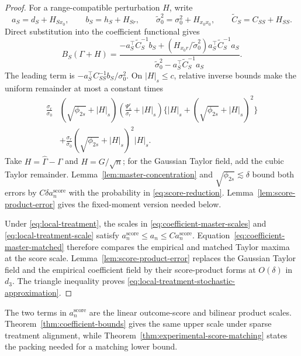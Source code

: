\documentclass[a4paper,11pt,english]{article}
\begin{document}
\begin{proof}
For a range-compatible perturbation $H$, write
\[
        a_S=d_S+H_{Sx_0},\qquad b_S=h_S+H_{Sr},\qquad
        \widetilde\sigma_0^2=\sigma_0^2+H_{x_0x_0},\qquad
        \widetilde C_S=C_{SS}+H_{SS}.
\]
Direct substitution into the coefficient functional gives
\begin{equation}\label{eq:exact-local-treatment-perturbation}
        B_S(\Gamma+H)
        =\frac{
        -a_S^\top\widetilde C_S^{-1}b_S
        +(H_{x_0r}/\widetilde\sigma_0^2)
        a_S^\top\widetilde C_S^{-1}a_S}
        {\widetilde\sigma_0^2
        -a_S^\top\widetilde C_S^{-1}a_S}.
\end{equation}
The leading term is
$-a_S^\top C_{SS}^{-1}b_S/\sigma_0^2$.
On $|H|_s\le c$, relative inverse bounds make the uniform remainder at
most a constant times
\begin{equation*}
\begin{split}
 \frac{\sigma_r}{\sigma_0}
 &(\sqrt{\phi_{2s}}+|H|_s)
 \left(\frac{\Psi_s^r}{\sigma_r}+|H|_s\right)
 \{ |H|_s+(\sqrt{\phi_{2s}}+|H|_s)^2\}\\
 &+\frac{\sigma_r}{\sigma_0}
 (\sqrt{\phi_{2s}}+|H|_s)^2|H|_s.
\end{split}
\end{equation*}
Take $H=\hat\Gamma-\Gamma$ and $H=G/\sqrt n$; for the Gaussian Taylor
field, add the cubic Taylor remainder.  Lemma~\ref{lem:master-concentration}
and $\sqrt{\phi_{2s}}\lesssim\delta$ bound both errors by
$C\delta a_n^{\mathrm{score}}$ with the probability in
\eqref{eq:score-reduction}.  Lemma~\ref{lem:score-product-error} gives the
fixed-moment version needed below.

Under \eqref{eq:local-treatment}, the scales in
\eqref{eq:coefficient-master-scales} and
\eqref{eq:local-treatment-scale} satisfy
$a_n^{\mathrm{score}}\le a_n\le C a_n^{\mathrm{score}}$.
Equation~\eqref{eq:coefficient-master-matched} therefore compares the
empirical and matched Taylor maxima at the score scale.
Lemma~\ref{lem:score-product-error} replaces the Gaussian Taylor field and
the empirical coefficient field by their score-product forms at
$O(\delta)$ in $d_3$.  The triangle
inequality proves
\eqref{eq:local-treatment-stochastic-approximation}.
\end{proof}

The two terms in $a_n^{\mathrm{score}}$ are the linear outcome-score and
bilinear product scales.  Theorem~\ref{thm:coefficient-bounds} gives the
same upper scale under sparse treatment alignment, while
Theorem~\ref{thm:experimental-score-matching} states the packing needed
for a matching lower bound.
\end{document}
